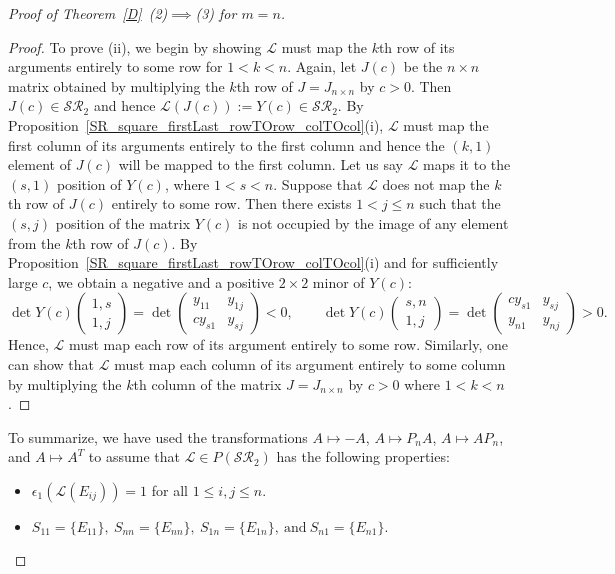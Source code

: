 \documentclass[11pt,reqno]{amsart}
\theoremstyle{plain}
\theoremstyle{definition}
\numberwithin{equation}{section}
\begin{document}
\begin{proof}[Proof of Theorem~\ref{D}~(2)$\implies$(3) for $m=n$]
\begin{proof}
		To prove (ii), we begin by showing $\mathcal{L}$ must map the $k$th row of its arguments entirely to some row for $1<k<n$. Again, let $J(c)$ be the $n\times n$ matrix  obtained by multiplying the $k$th row of $J=J_{n\times n}$ by $c>0$. Then $J(c)\in \mathcal{SR}_2$ and hence $\mathcal{L}(J(c)):=Y(c)\in\mathcal{SR}_2$. By Proposition~\ref{SR_square_firstLast_rowTOrow_colTOcol}(i), $\mathcal{L}$ must map the first column of its arguments entirely to the first column and hence the $(k,1)$ element of $J(c)$ will be mapped to the first column. Let us say $\mathcal{L}$ maps it to the $(s,1)$ position of $Y(c)$, where $1<s<n$. Suppose that $\mathcal{L}$ does not map the $k$th row of $J(c)$ entirely to some row. Then there exists $1<j\leq n$ such that the $(s,j)$ position of the matrix $Y(c)$ is not occupied by the image of any element from the $k$th row of $J(c)$. By Proposition~\ref{SR_square_firstLast_rowTOrow_colTOcol}(i) and for sufficiently large $c$, we obtain a negative and a positive $2 \times 2$ minor of $Y(c)$:
		\[ \det Y(c)\begin{pmatrix}1,s\\1,j\end{pmatrix} = \det
		\begin{pmatrix}
			y_{11} & y_{1j} \\
			cy_{s1} & y_{sj}
		\end{pmatrix} < 0, \qquad
		\det Y(c)\begin{pmatrix}s,n\\1,j\end{pmatrix} = \det
		\begin{pmatrix}
			cy_{s1} & y_{sj} \\
			y_{n1} & y_{nj}
		\end{pmatrix}>0.\]
		Hence, $\mathcal{L}$ must map each row of its argument entirely to some row. Similarly, one can show that $\mathcal{L}$ must map each column of its argument entirely to some column by multiplying the $k$th column of the matrix $J=J_{n\times n}$ by $c>0$ where $1<k<n$.
	\end{proof}
	
	To summarize, we have used the transformations $A\mapsto-A$, $A\mapsto P_nA$, $A\mapsto AP_n$, and $A\mapsto A^T$ to assume that $\mathcal{L}\in P(\mathcal{SR}_2)$ has the following properties:
	\begin{itemize}
		\item[(i)] $\epsilon_1(\mathcal{L}(E_{ij}))=1$ for all $1\leq i,j\leq n$.
		
		\item[(ii)] $S_{11}=\{E_{11}\},~ S_{nn}=\{E_{nn}\},~ S_{1n}=\{E_{1n}\}, ~\text{and}~ S_{n1}=\{E_{n1}\}$.
		

\end{itemize}
\end{proof}
\end{document}
